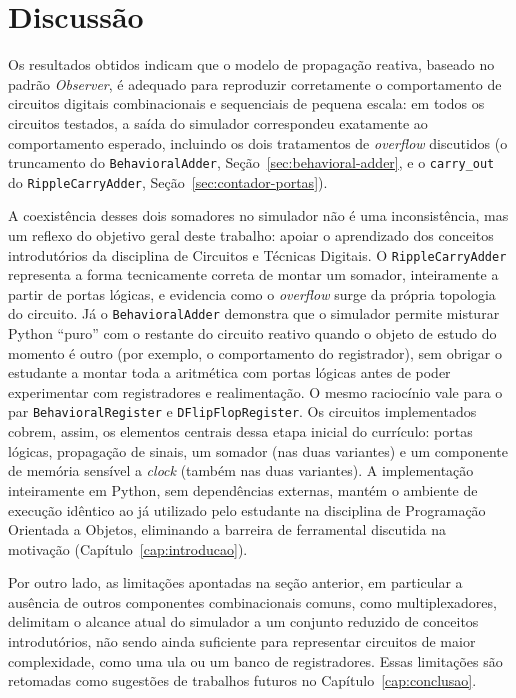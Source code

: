 \section{Discussão}
\label{sec:discussao}

Os resultados obtidos indicam que o modelo de propagação reativa, baseado no padrão \textit{Observer}, é adequado para reproduzir corretamente o comportamento de circuitos digitais combinacionais e sequenciais de pequena escala: em todos os circuitos testados, a saída do simulador correspondeu exatamente ao comportamento esperado, incluindo os dois tratamentos de \textit{overflow} discutidos (o truncamento do \texttt{BehavioralAdder}, Seção~\ref{sec:behavioral-adder}, e o \texttt{carry\_out} do \texttt{RippleCarryAdder}, Seção~\ref{sec:contador-portas}).

A coexistência desses dois somadores no simulador não é uma inconsistência, mas um reflexo do objetivo geral deste trabalho: apoiar o aprendizado dos conceitos introdutórios da disciplina de Circuitos e Técnicas Digitais. O \texttt{RippleCarryAdder} representa a forma tecnicamente correta de montar um somador, inteiramente a partir de portas lógicas, e evidencia como o \textit{overflow} surge da própria topologia do circuito. Já o \texttt{BehavioralAdder} demonstra que o simulador permite misturar Python ``puro'' com o restante do circuito reativo quando o objeto de estudo do momento é outro (por exemplo, o comportamento do registrador), sem obrigar o estudante a montar toda a aritmética com portas lógicas antes de poder experimentar com registradores e realimentação. O mesmo raciocínio vale para o par \texttt{BehavioralRegister} e \texttt{DFlipFlopRegister}. Os circuitos implementados cobrem, assim, os elementos centrais dessa etapa inicial do currículo: portas lógicas, propagação de sinais, um somador (nas duas variantes) e um componente de memória sensível a \textit{clock} (também nas duas variantes). A implementação inteiramente em Python, sem dependências externas, mantém o ambiente de execução idêntico ao já utilizado pelo estudante na disciplina de Programação Orientada a Objetos, eliminando a barreira de ferramental discutida na motivação (Capítulo~\ref{cap:introducao}).

Por outro lado, as limitações apontadas na seção anterior, em particular a ausência de outros componentes combinacionais comuns, como multiplexadores, delimitam o alcance atual do simulador a um conjunto reduzido de conceitos introdutórios, não sendo ainda suficiente para representar circuitos de maior complexidade, como uma \gls{ula} ou um banco de registradores. Essas limitações são retomadas como sugestões de trabalhos futuros no Capítulo~\ref{cap:conclusao}.
